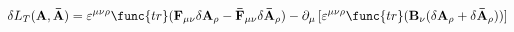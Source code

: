 \begin{equation}
\delta L_{T}({\bf A},{\bf \bar{A}})=\varepsilon ^{\mu \nu \rho }
\func{tr}({\bf F}_{\mu \nu }\delta {\bf A}_{\rho }-{\bf
\bar{F}}_{\mu \nu }\delta {\bf\bar{A}}_{\rho })-\partial _{\mu }\,
[\varepsilon ^{\mu \nu \rho }\func{tr}({\bf B}_{\nu }(\delta {\bf
A}_{\rho }+\delta {\bf \bar{A}}_{\rho }))] \label{eqn:13}
\end{equation}

